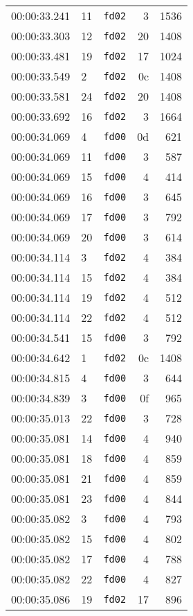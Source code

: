 \documentclass{article}
\begin{document}
\begin{longtable}{lllrr}
00:00:33.241 & 11 & \texttt{fd02} & 3 & 1536 \\
00:00:33.303 & 12 & \texttt{fd02} & 20 & 1408 \\
00:00:33.481 & 19 & \texttt{fd02} & 17 & 1024 \\
00:00:33.549 & 2 & \texttt{fd02} & 0c & 1408 \\
00:00:33.581 & 24 & \texttt{fd02} & 20 & 1408 \\
00:00:33.692 & 16 & \texttt{fd02} & 3 & 1664 \\
00:00:34.069 & 4 & \texttt{fd00} & 0d & 621 \\
00:00:34.069 & 11 & \texttt{fd00} & 3 & 587 \\
00:00:34.069 & 15 & \texttt{fd00} & 4 & 414 \\
00:00:34.069 & 16 & \texttt{fd00} & 3 & 645 \\
00:00:34.069 & 17 & \texttt{fd00} & 3 & 792 \\
00:00:34.069 & 20 & \texttt{fd00} & 3 & 614 \\
00:00:34.114 & 3 & \texttt{fd02} & 4 & 384 \\
00:00:34.114 & 15 & \texttt{fd02} & 4 & 384 \\
00:00:34.114 & 19 & \texttt{fd02} & 4 & 512 \\
00:00:34.114 & 22 & \texttt{fd02} & 4 & 512 \\
00:00:34.541 & 15 & \texttt{fd00} & 3 & 792 \\
00:00:34.642 & 1 & \texttt{fd02} & 0c & 1408 \\
00:00:34.815 & 4 & \texttt{fd00} & 3 & 644 \\
00:00:34.839 & 3 & \texttt{fd00} & 0f & 965 \\
00:00:35.013 & 22 & \texttt{fd00} & 3 & 728 \\
00:00:35.081 & 14 & \texttt{fd00} & 4 & 940 \\
00:00:35.081 & 18 & \texttt{fd00} & 4 & 859 \\
00:00:35.081 & 21 & \texttt{fd00} & 4 & 859 \\
00:00:35.081 & 23 & \texttt{fd00} & 4 & 844 \\
00:00:35.082 & 3 & \texttt{fd00} & 4 & 793 \\
00:00:35.082 & 15 & \texttt{fd00} & 4 & 802 \\
00:00:35.082 & 17 & \texttt{fd00} & 4 & 788 \\
00:00:35.082 & 22 & \texttt{fd00} & 4 & 827 \\
00:00:35.086 & 19 & \texttt{fd02} & 17 & 896 \\

\end{longtable}
\end{document}
